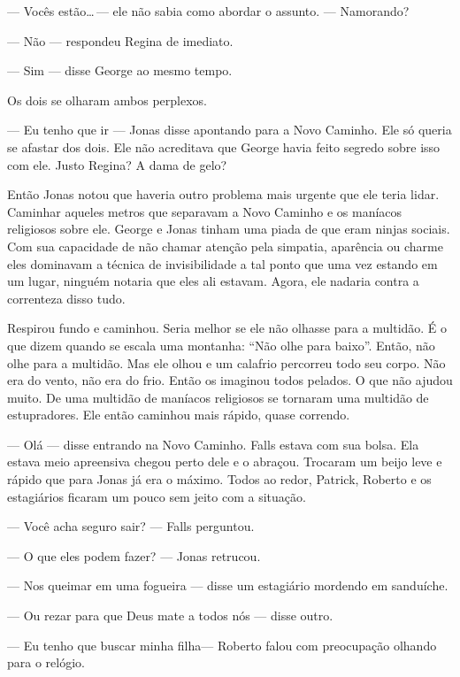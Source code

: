 --- Vocês estão\ldots\,--- ele não sabia como abordar o assunto. --- Namorando?

--- Não --- respondeu Regina de imediato.

--- Sim --- disse George\mudanca{,} ao mesmo tempo.

Os dois se olharam ambos perplexos.

--- Eu tenho que ir --- Jonas disse apontando para a Novo Caminho. Ele só queria se afastar dos dois. Ele não acreditava que George havia feito segredo sobre isso com ele. Justo Regina? A dama de gelo?

Então Jonas notou que haveria outro problema mais urgente que ele teria  lidar. Caminhar aqueles metros que separavam a Novo Caminho e os maníacos religiosos  sobre ele. George e Jonas tinham uma piada de que eram ninjas sociais. Com sua capacidade de não chamar atenção pela simpatia, aparência ou charme\mudanca{,} eles dominavam a técnica de invisibilidade a tal ponto que uma vez estando em um lugar, ninguém notaria que eles ali estavam. Agora, ele nadaria contra a correnteza disso tudo.

Respirou fundo e caminhou. Seria melhor se ele não olhasse para a multidão. É o que dizem quando se escala uma montanha: ``Não olhe para baixo''. Então, não olhe para a multidão. Mas ele olhou e um calafrio percorreu todo seu corpo. Não era do vento, não era do frio. Então os imaginou todos pelados. O que não ajudou muito. De uma multidão de maníacos religiosos se tornaram uma multidão de estupradores. Ele então caminhou mais rápido, quase correndo.

--- Olá --- disse\mudanca{,} entrando na Novo Caminho. Falls estava com sua bolsa. Ela estava meio apreensiva chegou perto dele e o abraçou. Trocaram um beijo leve e rápido que\mudanca{,} para Jonas\mudanca{,} já era o máximo. Todos ao redor, Patrick, Roberto e os estagiários\mudanca{,} ficaram um pouco sem jeito com a situação.

--- Você acha seguro sair? --- Falls perguntou.

--- O que eles podem fazer?  --- Jonas retrucou.

--- Nos queimar em uma fogueira --- disse um estagiário\mudanca{,} mordendo em sanduíche.

--- Ou rezar para que Deus mate a todos nós --- disse outro.

--- Eu tenho que buscar minha filha--- Roberto falou com preocupação\mudanca{,} olhando para o relógio.

